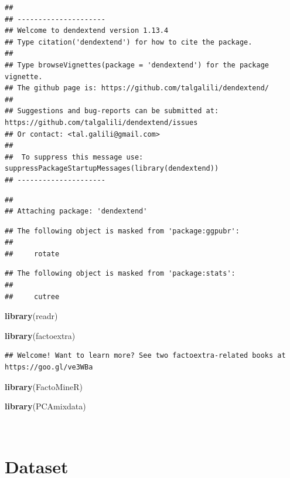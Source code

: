 \documentclass[
]{article}
\newenvironment{Shaded}{\begin{snugshade}}{\end{snugshade}}
\newcommand{\KeywordTok}[1]{\textcolor[rgb]{0.13,0.29,0.53}{\textbf{#1}}}
\newcommand{\NormalTok}[1]{#1}
\begin{document}
\begin{verbatim}
## 
## ---------------------
## Welcome to dendextend version 1.13.4
## Type citation('dendextend') for how to cite the package.
## 
## Type browseVignettes(package = 'dendextend') for the package vignette.
## The github page is: https://github.com/talgalili/dendextend/
## 
## Suggestions and bug-reports can be submitted at: https://github.com/talgalili/dendextend/issues
## Or contact: <tal.galili@gmail.com>
## 
##  To suppress this message use:  suppressPackageStartupMessages(library(dendextend))
## ---------------------
\end{verbatim}

\begin{verbatim}
## 
## Attaching package: 'dendextend'
\end{verbatim}

\begin{verbatim}
## The following object is masked from 'package:ggpubr':
## 
##     rotate
\end{verbatim}

\begin{verbatim}
## The following object is masked from 'package:stats':
## 
##     cutree
\end{verbatim}

\begin{Shaded}
\begin{Highlighting}[]
\KeywordTok{library}\NormalTok{(readr)}

\KeywordTok{library}\NormalTok{(factoextra)}
\end{Highlighting}
\end{Shaded}

\begin{verbatim}
## Welcome! Want to learn more? See two factoextra-related books at https://goo.gl/ve3WBa
\end{verbatim}

\begin{Shaded}
\begin{Highlighting}[]
\KeywordTok{library}\NormalTok{(FactoMineR)}


\KeywordTok{library}\NormalTok{(PCAmixdata)}
\end{Highlighting}
\end{Shaded}

~\\

\hypertarget{dataset}{%
\section{Dataset}\label{dataset}}
\end{document}
